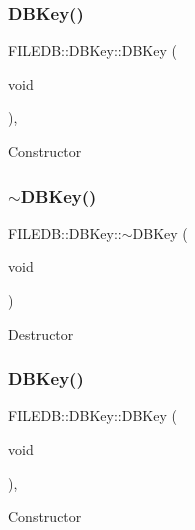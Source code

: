\subsubsection{\texorpdfstring{DBKey()}{DBKey()}\hspace{0.1cm}{\footnotesize\ttfamily [2/3]}}
{\footnotesize\ttfamily F\+I\+L\+E\+D\+B\+::\+D\+B\+Key\+::\+D\+B\+Key (\begin{DoxyParamCaption}\item[{void}]{ }\end{DoxyParamCaption})\hspace{0.3cm}{\ttfamily [inline]}, {\ttfamily [protected]}}

Constructor \mbox{\label{classFILEDB_1_1DBKey_a5f8d52f7400d7723ab1093b46c3fbdf2}} 
\subsubsection{\texorpdfstring{$\sim$DBKey()}{~DBKey()}\hspace{0.1cm}{\footnotesize\ttfamily [3/3]}}
{\footnotesize\ttfamily F\+I\+L\+E\+D\+B\+::\+D\+B\+Key\+::$\sim$\+D\+B\+Key (\begin{DoxyParamCaption}\item[{void}]{ }\end{DoxyParamCaption})\hspace{0.3cm}{\ttfamily [inline]}}

Destructor \mbox{\label{classFILEDB_1_1DBKey_a9cd02eea470fc674d8f237a1919168cf}} 
\subsubsection{\texorpdfstring{DBKey()}{DBKey()}\hspace{0.1cm}{\footnotesize\ttfamily [3/3]}}
{\footnotesize\ttfamily F\+I\+L\+E\+D\+B\+::\+D\+B\+Key\+::\+D\+B\+Key (\begin{DoxyParamCaption}\item[{void}]{ }\end{DoxyParamCaption})\hspace{0.3cm}{\ttfamily [inline]}, {\ttfamily [protected]}}

Constructor 


